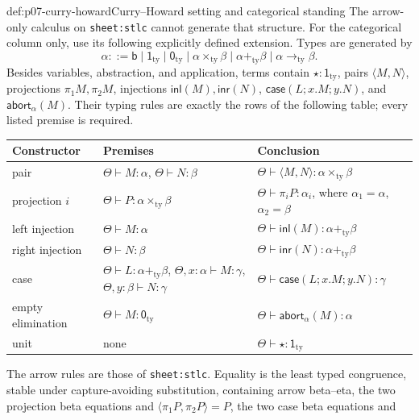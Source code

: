 \begin{hbdefinition}{def:p07-curry-howard}{Curry--Howard setting and categorical standing}
The arrow-only calculus on \texttt{sheet:stlc} cannot generate that structure.
For the categorical column only, use its following explicitly defined
extension.  Types are generated by
\[
 \alpha::=\mathsf b\mid\mathsf 1_{\mathrm{ty}}\mid\mathsf 0_{\mathrm{ty}}
          \mid\alpha\mathbin{\times_{\mathrm{ty}}}\beta
          \mid\alpha\mathbin{+_{\mathrm{ty}}}\beta
          \mid\alpha\mathbin{\to_{\mathrm{ty}}}\beta.
\]
Besides variables, abstraction, and application, terms contain
\(\star:\mathsf 1_{\mathrm{ty}}\), pairs \(\langle M,N\rangle\), projections
\(\pi_1M,\pi_2M\), injections \(\mathsf{inl}(M),\mathsf{inr}(N)\),
\(\mathsf{case}(L;x.M;y.N)\), and \(\mathsf{abort}_{\alpha}(M)\).
Their typing rules are exactly the rows of the following table; every listed
premise is required.
\begin{center}
\begingroup\small
\begin{tabularx}{\textwidth}{@{}l X X@{}}
\toprule
Constructor & Premises & Conclusion \\
\midrule
pair & \(\Theta\vdash M:\alpha\), \(\Theta\vdash N:\beta\) &
\(\Theta\vdash\langle M,N\rangle:
  \alpha\mathbin{\times_{\mathrm{ty}}}\beta\) \\
projection \(i\) & \(\Theta\vdash P:
  \alpha\mathbin{\times_{\mathrm{ty}}}\beta\) &
\(\Theta\vdash\pi_iP:\alpha_i\), where
\(\alpha_1=\alpha\), \(\alpha_2=\beta\) \\
left injection & \(\Theta\vdash M:\alpha\) &
\(\Theta\vdash\mathsf{inl}(M):\alpha\mathbin{+_{\mathrm{ty}}}\beta\) \\
right injection & \(\Theta\vdash N:\beta\) &
\(\Theta\vdash\mathsf{inr}(N):\alpha\mathbin{+_{\mathrm{ty}}}\beta\) \\
case & \(\Theta\vdash L:\alpha\mathbin{+_{\mathrm{ty}}}\beta\),
\(\Theta,x:\alpha\vdash M:\gamma\),
\(\Theta,y:\beta\vdash N:\gamma\) &
\(\Theta\vdash\mathsf{case}(L;x.M;y.N):\gamma\) \\
empty elimination & \(\Theta\vdash M:\mathsf 0_{\mathrm{ty}}\) &
\(\Theta\vdash\mathsf{abort}_{\alpha}(M):\alpha\) \\
unit & none & \(\Theta\vdash\star:\mathsf 1_{\mathrm{ty}}\) \\
\bottomrule
\end{tabularx}
\endgroup
\end{center}
The arrow rules are those of \texttt{sheet:stlc}.  Equality is the least typed
congruence, stable under capture-avoiding substitution, containing arrow
beta--eta, the two projection beta equations and
\(\langle\pi_1P,\pi_2P\rangle=P\), the two case beta equations and

\end{hbdefinition}
